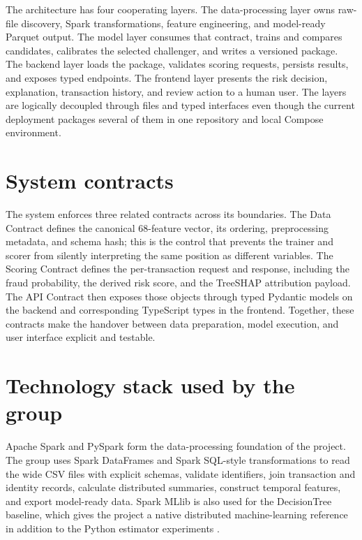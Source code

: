 The architecture has four cooperating layers. The data-processing layer owns
raw-file discovery, Spark transformations, feature engineering, and model-ready
Parquet output. The model layer consumes that contract, trains and compares
candidates, calibrates the selected challenger, and writes a versioned package.
The backend layer loads the package, validates scoring requests, persists
results, and exposes typed endpoints. The frontend layer presents the risk
decision, explanation, transaction history, and review action to a human user.
The layers are logically decoupled through files and typed interfaces even
though the current deployment packages several of them in one repository and
local Compose environment.



\section{System contracts}

The system enforces three related contracts across its boundaries. The Data Contract defines the canonical 68-feature vector, its ordering, preprocessing metadata, and schema hash; this is the control that prevents the trainer and scorer from silently interpreting the same position as different variables. The Scoring Contract defines the per-transaction request and response, including the fraud probability, the derived risk score, and the TreeSHAP attribution payload. The API Contract then exposes those objects through typed Pydantic models on the backend and corresponding TypeScript types in the frontend. Together, these contracts make the handover between data preparation, model execution, and user interface explicit and testable.



\section{Technology stack used by the group}

Apache Spark and PySpark form the data-processing foundation of the project.
The group uses Spark DataFrames and Spark SQL-style transformations to read
the wide CSV files with explicit schemas, validate identifiers, join
transaction and identity records, calculate distributed summaries, construct
temporal features, and export model-ready data. Spark MLlib is also used for
the DecisionTree baseline, which gives the project a native distributed
machine-learning reference in addition to the Python estimator experiments
\parencite{zaharia2016spark,meng2016mllib,sparkmllibguide}.

